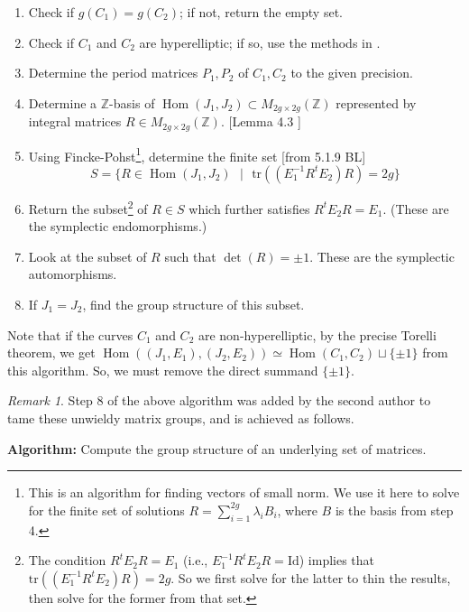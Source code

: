 \documentclass[12pt,reqno]{amsart}
\DeclareMathOperator{\Hom}{Hom}
\newcommand{\Z}{\mathbb{Z}}
\theoremstyle{definition}
\theoremstyle{remark}
\newtheorem*{remark}{Remark}
\begin{document}
\begin{enumerate}
\item Check if $g(C_1) = g(C_2)$; if not, return the empty set.
\item Check if $C_1$ and $C_2$ are hyperelliptic; if so, use the methods in \cite{hyp}.
\item Determine the period matrices $P_1, P_2$ of $C_1, C_2$ to the given precision.
\item Determine a $\Z$-basis of $\Hom(J_1, J_2) \subset M_{2g \times 2g}(\Z)$ represented by integral matrices $R \in  M_{2g \times 2g}(\Z)$. [Lemma 4.3 \cite{jeroen}]
\item Using Fincke-Pohst\footnote{This is an algorithm for finding vectors of small norm. We use it here to solve for the finite set of solutions $R = \sum_{i = 1}^{2g} \lambda_i B_i$, where $B$ is the basis from step 4.}, determine the finite set [from 5.1.9 BL] $$S = \{ R \in \Hom(J_1, J_2) \text{ } | \text{ } \text{tr}((E_1^{-1}R^tE_2)R) = 2g\}$$
\item Return the subset\footnote{The condition $R^tE_2R = E_1$ (i.e., $E_1^{-1}R^tE_2R = \text{Id}$) implies that $\text{tr}((E_1^{-1}R^tE_2)R) = 2g$. So we first solve for the latter to thin the results, then solve for the former from that set.}  of $R \in S$ which further satisfies $R^tE_2R = E_1$. (These are the symplectic endomorphisms.)
\item Look at the subset of $R$ such that $\det(R) = \pm 1$. These are the symplectic automorphisms.
\item If $J_1 = J_2$, find the group structure of this subset.
\end{enumerate}

\vspace{+10pt} 

Note that if the curves $C_1$ and $C_2$ are non-hyperelliptic, by the precise Torelli theorem, we get $\Hom((J_1, E_1), (J_2, E_2)) \simeq \Hom(C_1, C_2) \sqcup \{ \pm 1 \}$ from this algorithm. So, we must remove the direct summand $\{ \pm 1 \}$.

\begin{remark} Step 8 of the above algorithm was added by the second author to tame these unwieldy matrix groups, and is achieved as follows.\end{remark}

\textbf{Algorithm:} Compute the group structure of an underlying set of matrices.
\end{document}
